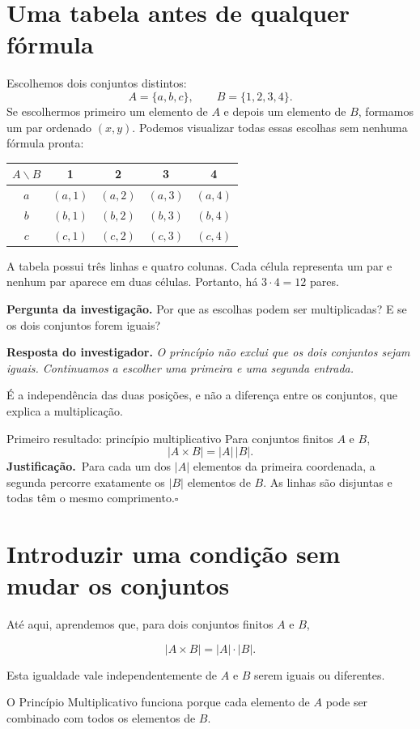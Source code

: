 \documentclass[11pt,a4paper,oneside]{book}
\newcommand{\Pergunta}[1]{\begin{perguntabox}\textbf{Pergunta da investigação.} #1\end{perguntabox}}
\newcommand{\Resposta}[1]{\textcolor{verdeescuro}{\textbf{Resposta do investigador.}} \emph{#1}\par}
\newcommand{\prova}{\textbf{Justificação.}\ }
\newcommand{\fimprova}{\hfill$\square$}
\newcommand{\card}[1]{\lvert #1\rvert}
\begin{document}
\section{Uma tabela antes de qualquer fórmula}
Escolhemos dois conjuntos distintos:
\[
A=\{a,b,c\},\qquad B=\{1,2,3,4\}.
\]
Se escolhermos primeiro um elemento de $A$ e depois um elemento de $B$, formamos um par ordenado $(x,y)$. Podemos visualizar todas essas escolhas sem nenhuma fórmula pronta:
\begin{center}
\begin{tabular}{c|cccc}
$A\backslash B$&1&2&3&4\\\hline
$a$&$(a,1)$&$(a,2)$&$(a,3)$&$(a,4)$\\
$b$&$(b,1)$&$(b,2)$&$(b,3)$&$(b,4)$\\
$c$&$(c,1)$&$(c,2)$&$(c,3)$&$(c,4)$
\end{tabular}
\end{center}
A tabela possui três linhas e quatro colunas. Cada célula representa um par e nenhum par aparece em duas células. Portanto, há $3\cdot4=12$ pares.
\Pergunta{Por que as escolhas podem ser multiplicadas? E se os dois conjuntos forem iguais?}
\Resposta{O princípio não exclui que os dois conjuntos sejam iguais. Continuamos a escolher uma primeira e uma segunda entrada.}
É a independência das duas posições, e não a diferença entre os conjuntos, que explica a multiplicação.
\begin{teoremabox}{Primeiro resultado: princípio multiplicativo}
Para conjuntos finitos $A$ e $B$,
\[\card{A\times B}=\card A\,\card B.\]
\prova Para cada um dos $\card A$ elementos da primeira coordenada, a segunda percorre exatamente os $\card B$ elementos de $B$. As linhas são disjuntas e todas têm o mesmo comprimento.\fimprova
\end{teoremabox}

\section{Introduzir uma condição sem mudar os conjuntos}

Até aqui, aprendemos que, para dois conjuntos
finitos $A$ e $B$,

\[
\card{A\times B}=\card A\cdot\card B.
\]

Esta igualdade vale independentemente de
$A$ e $B$ serem iguais ou diferentes.

O Princípio Multiplicativo funciona
porque cada elemento de $A$ pode
ser combinado com todos os elementos de $B$.
\end{document}
